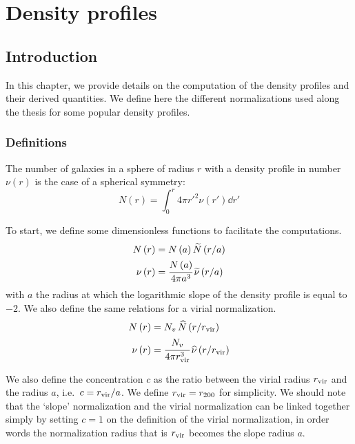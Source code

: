 \chapter{Density profiles}
\label{cha:profiles}

\section{Introduction}

In this chapter, we provide details on the computation of the density profiles
and their derived quantities. We define here the different normalizations used
along the thesis for some popular density profiles.

\subsection{Definitions}

The number of galaxies in a sphere of radius $r$ with a density profile in
number $\nu(r)$ is the case of a spherical symmetry:
%
\begin{equation}
    N\left(r\right)=\int_0^r4\pi {r'}^2 \nu(r')\dd{r'}
\end{equation}

To start, we define some dimensionless functions to facilitate the
computations.
%
\begin{eqnarray}
    N\left(r\right)&=N\left(a\right){\widetilde{N}\left(r/a\right)}\nonumber\\
    \nu\left(r\right)&=
        \cfrac{N\left(a\right)}{4\pi{a^3}}
        \,\widetilde\nu\left(r/a\right)
\end{eqnarray}
%
with $a$ the radius at which the logarithmic slope of the density profile is
equal to $-2$. We also define the same relations for a
virial normalization.
%
\begin{eqnarray}
    N\left(r\right)&={N_v}\,{\widehat{N}\left(r/r_{\rm vir}\right)}\nonumber\\
    \nu\left(r\right)&=
        \cfrac{N_v}{4\pi r_{\rm vir}^3}\,\widehat\nu\left(r/r_{\rm vir}\right)
\end{eqnarray}

We also define the concentration $c$ as the ratio between the virial radius
$r_{\rm vir}$ and the radius $a$, i.e.\ $c=r_{\rm vir}/a$. We define $r_{\rm vir}=r_{200}$ for
simplicity. We should note that the `slope' normalization and the virial
normalization can be linked together simply by setting $c=1$ on the definition
of the virial normalization, in order words the normalization radius that is
$r_{\rm vir}$ becomes the slope radius $a$.

